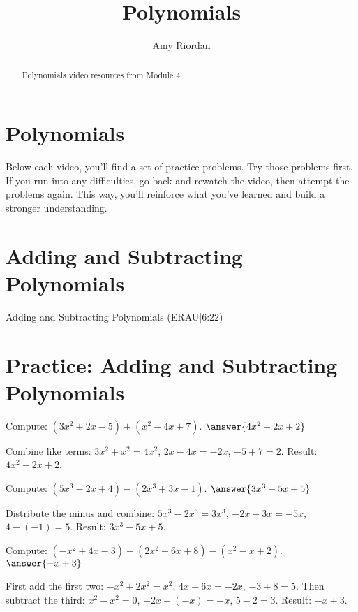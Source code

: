 \documentclass{ximera}
\title{Polynomials}
\author{Amy Riordan}
\begin{document}
\begin{abstract}
Polynomials video resources from Module 4.
\end{abstract}
\maketitle

\section*{Polynomials}

Below each video, you’ll find a set of practice problems. Try those problems first. If you run into any difficulties, go back and rewatch the video, then attempt the problems again. This way, you’ll reinforce what you’ve learned and build a stronger understanding.

\section*{Adding and Subtracting Polynomials}

Adding and Subtracting Polynomials (ERAU|6:22)



\section*{Practice: Adding and Subtracting Polynomials}

\begin{problem}
Compute: \((3x^2 + 2x - 5) + (x^2 - 4x + 7)\). $\answer{4x^2 - 2x + 2}$
\begin{feedback}
Combine like terms: \(3x^2 + x^2 = 4x^2\), \(2x - 4x = -2x\), \(-5 + 7 = 2\). Result: \(4x^2 - 2x + 2\).
\end{feedback}
\end{problem}

\begin{problem}
Compute: \((5x^3 - 2x + 4) - (2x^3 + 3x - 1)\). $\answer{3x^3 - 5x + 5}$
\begin{feedback}
Distribute the minus and combine: \(5x^3 - 2x^3 = 3x^3\), \(-2x - 3x = -5x\), \(4 - (-1) = 5\). Result: \(3x^3 - 5x + 5\).
\end{feedback}
\end{problem}

\begin{problem}
Compute: \((-x^2 + 4x - 3) + (2x^2 - 6x + 8) - (x^2 - x + 2)\). $\answer{-x + 3}$
\begin{feedback}
First add the first two: \(-x^2+2x^2 = x^2\), \(4x-6x=-2x\), \(-3+8=5\). Then subtract the third: \(x^2-x^2=0\), \(-2x - (-x) = -x\), \(5-2=3\). Result: \(-x+3\).
\end{feedback}
\end{problem}
\end{document}

